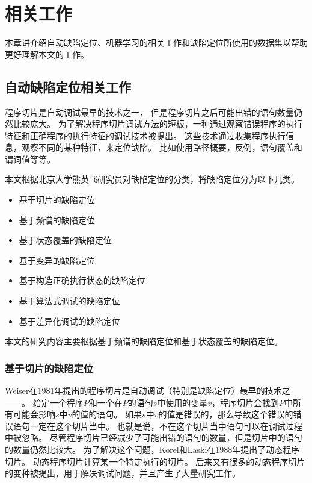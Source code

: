 \chapter{相关工作}

本章讲介绍自动缺陷定位、机器学习的相关工作和缺陷定位所使用的数据集以帮助更好理解本文的工作。

\section{自动缺陷定位相关工作}

程序切片\parencite{Weiser1981Program,Weiser1984Program}是自动调试最早的技术之一，
但是程序切片之后可能出错的语句数量仍然比较庞大。
为了解决程序切片调试方法的短板，一种通过观察错误程序的执行特征和正确程序的执行特征的调试技术被提出。
这些技术通过收集程序执行信息，观察不同的某种特征，来定位缺陷。
比如使用路径概要\parencite{Reps1997The}，反例\parencite{Ball2003From,Groce2004Understanding}，语句覆盖\parencite{Jones2002Visualization}和谓词值\parencite{Liblit2005Scalable,Liu2005SOBER}等等。

本文根据北京大学熊英飞研究员对缺陷定位的分类\parencite{YingfeiFL}，将缺陷定位分为以下几类。

\begin{itemize}
\item 基于切片的缺陷定位
\item 基于频谱的缺陷定位
\item 基于状态覆盖的缺陷定位
\item 基于变异的缺陷定位
\item 基于构造正确执行状态的缺陷定位
\item 基于算法式调试的缺陷定位
\item 基于差异化调试的缺陷定位
\end{itemize}

本文的研究内容主要根据基于频谱的缺陷定位和基于状态覆盖的缺陷定位。

\subsection{基于切片的缺陷定位}

Weiser在1981年提出的程序切片\parencite{Weiser1981Program,Weiser1984Program}是自动调试（特别是缺陷定位）最早的技术之——。
给定一个程序$P$和一个在$P$的语句$s$中使用的变量$v$，程序切片会找到$P$中所有可能会影响$s$中$v$的值的语句。
如果$s$中$v$的值是错误的，那么导致这个错误的错误语句一定在这个切片当中。
也就是说，不在这个切片当中语句可以在调试过程中被忽略。
尽管程序切片已经减少了可能出错的语句的数量，但是切片中的语句的数量仍然比较大。
为了解决这个问题，Korel和Laski在1988年提出了动态程序切片\parencite{Korel1988Dynamic}。
动态程序切片计算某一个特定执行的切片。
后来又有很多的动态程序切片的变种被提出\parencite{Demillo1996Critical,Gyim1999An,Zhang2006Pruning,Zhang2003Precise}，用于解决调试问题，并且产生了大量研究工作\parencite{Agrawal1993Debugging,Liu2007Indexing,Al2005The,Alves2011Fault,Ju2014HSFal,Wotawa2010Fault,Mao2014Slice}。

